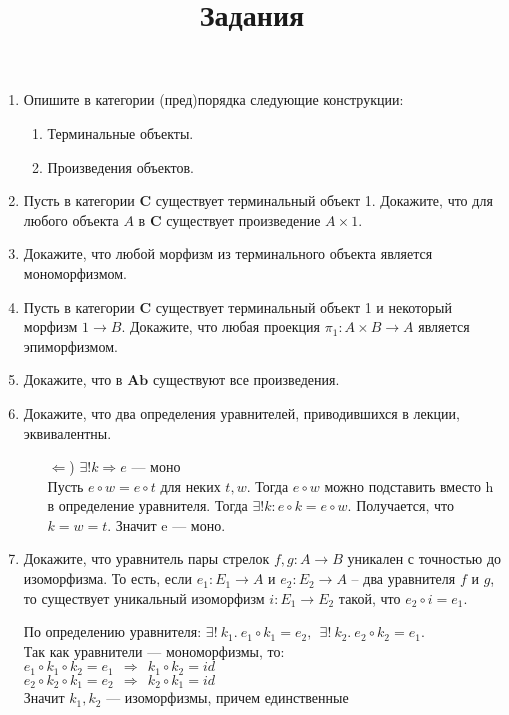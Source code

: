 \documentclass[draft]{article}
\newcommand{\cat}[1]{\mathbf{#1}}
\renewcommand{\C}{\cat{C}}
\newcommand{\Ab}{\cat{Ab}}
\begin{document}
\title{Задания}
\maketitle

\begin{enumerate}

\item Опишите в категории (пред)порядка следующие конструкции:
\begin{enumerate}
\item Терминальные объекты.
\item Произведения объектов.
\end{enumerate}

\item Пусть в категории $\C$ существует терминальный объект 1.
Докажите, что для любого объекта $A$ в $\C$ существует произведение $A \times 1$.

\item Докажите, что любой морфизм из терминального объекта является мономорфизмом.

\item Пусть в категории $\C$ существует терминальный объект 1 и некоторый морфизм $1 \to B$.
Докажите, что любая проекция $\pi_1 : A \times B \to A$ является эпиморфизмом.

\item Докажите, что в $\Ab$ существуют все произведения.

\item Докажите, что два определения уравнителей, приводившихся в лекции, эквивалентны.

\begin{itemize}
\item[$\Leftarrow$)] $\exists!k \Rightarrow e$ --- моно\\
Пусть $e \circ w = e \circ t$ для неких $t, w$. Тогда $e \circ w$ можно подставить вместо h в определение уравнителя. Тогда $\exists! k: e\circ k = e \circ w$. Получается, что $k = w = t$. Значит e --- моно.
\end{itemize}

\item Докажите, что уравнитель пары стрелок $f,g : A \to B$ уникален с точностью до изоморфизма.
То есть, если $e_1 : E_1 \to A$ и $e_2 : E_2 \to A$ -- два уравнителя $f$ и $g$, то существует уникальный изоморфизм $i : E_1 \to E_2$ такой, что $e_2 \circ i = e_1$.

По определению уравнителя: $\exists! ~k_1.~e_1\circ k_1 = e_2, ~~\exists! ~k_2.~e_2\circ k_2 = e_1$.\\
Так как уравнители --- мономорфизмы, то:\\
$e_1\circ k_1 \circ k_2 = e_1 ~~\Rightarrow~~ k_1 \circ k_2 = id$\\
$e_2\circ k_2 \circ k_1 = e_2 ~~\Rightarrow~~ k_2 \circ k_1 = id$\\
Значит $k_1, k_2$ --- изоморфизмы, причем единственные


\end{enumerate}
\end{document}
